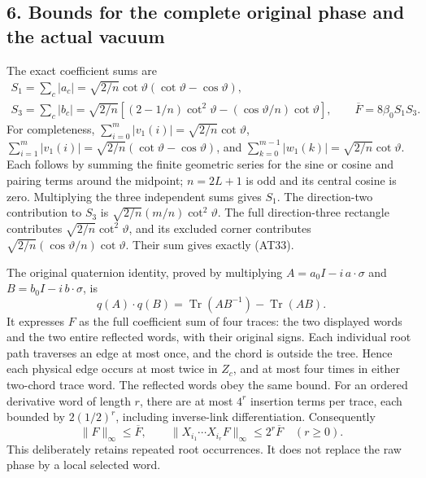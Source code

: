 \documentclass[11pt]{article}
\begin{document}
\subsection*{6. Bounds for the complete original phase and the actual vacuum}

The exact coefficient sums are
\[
 \begin{gathered}
 S_1=\sum_c|a_c|=\sqrt{2/n}\cot\vartheta
                         (\cot\vartheta-\cos\vartheta),\\
 S_3=\sum_c|b_c|=\sqrt{2/n}
       [(2-1/n)\cot^2\vartheta-(\cos\vartheta/n)\cot\vartheta],
 \qquad \overline F=8\beta_0S_1S_3 .
 \end{gathered}\tag{AT33}
\]
For completeness,
\(\sum_{i=0}^m|v_1(i)|=\sqrt{2/n}\cot\vartheta\),
\(\sum_{i=1}^m|v_1(i)|=\sqrt{2/n}(\cot\vartheta-\cos\vartheta)\),
and \(\sum_{k=0}^{m-1}|w_1(k)|=\sqrt{2/n}\cot\vartheta\).
Each follows by summing the finite geometric series for the sine or cosine and pairing terms around the midpoint; \(n=2L+1\) is odd and its central cosine is zero.
Multiplying the three independent sums gives \(S_1\).
The direction-two contribution to \(S_3\) is
\(\sqrt{2/n}(m/n)\cot^2\vartheta\).
The full direction-three rectangle contributes
\(\sqrt{2/n}\cot^2\vartheta\), and its excluded corner contributes
\(\sqrt{2/n}(\cos\vartheta/n)\cot\vartheta\).
Their sum gives exactly (AT33).

The original quaternion identity, proved by multiplying
\(A=a_0I-i\,a\cdot\sigma\) and \(B=b_0I-i\,b\cdot\sigma\), is
\[
 q(A)\cdot q(B)=\operatorname{Tr}(AB^{-1})-\operatorname{Tr}(AB).
 \tag{AT34}
\]
It expresses \(F\) as the full coefficient sum of four traces: the two displayed words and the two entire reflected words, with their original signs. Each individual root path traverses an edge at most once, and the chord is outside the tree. Hence each physical edge occurs at most twice in \(Z_c\), and at most four times in either two-chord trace word. The reflected words obey the same bound. For an ordered derivative word of length \(r\), there are at most \(4^r\) insertion terms per trace, each bounded by \(2(1/2)^r\), including inverse-link differentiation. Consequently
\[
 \|F\|_\infty\le\overline F,\qquad
 \|X_{i_1}\cdots X_{i_r}F\|_\infty
                         \le2^r\overline F\quad(r\ge0).
 \tag{AT35}
\]
This deliberately retains repeated root occurrences. It does not replace the raw phase by a local selected word.
\end{document}

